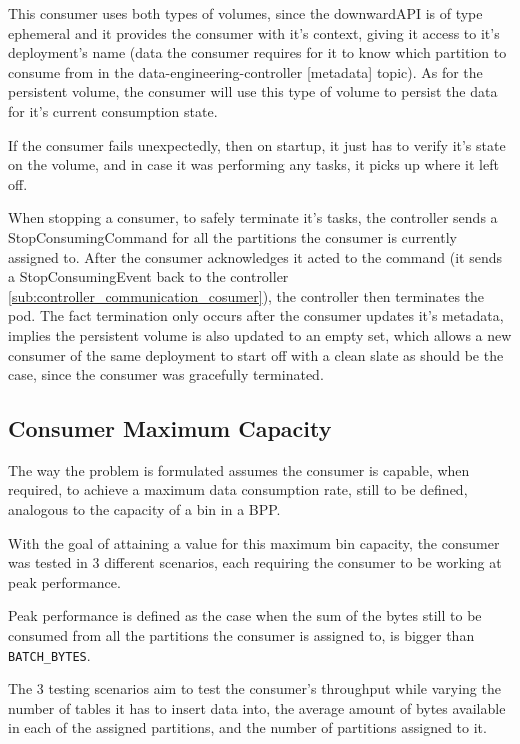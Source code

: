 This consumer uses both types of volumes, since the downwardAPI is of type
ephemeral and it provides the consumer with it's context, giving it access to
it's deployment's name (data the consumer requires for it to know which
partition to consume from in the data-engineering-controller [metadata] topic).
As for the persistent volume, the consumer will use this type of volume to
persist the data for it's current consumption state.

If the consumer fails unexpectedly, then on startup, it just has to verify it's
state on the volume, and in case it was performing any tasks, it picks up where
it left off.

When stopping a consumer, to safely terminate it's tasks, the controller sends a
StopConsumingCommand for all the partitions the consumer is currently assigned
to. After the consumer acknowledges it acted to the command (it sends a
StopConsumingEvent back to the controller
\ref{sub:controller_communication_cosumer}), the controller then terminates the
pod. The fact termination only occurs after the consumer updates it's metadata,
implies the persistent volume is also updated to an empty set, which allows a
new consumer of the same deployment to start off with a clean slate as should be
the case, since the consumer was gracefully terminated.


\subsection{Consumer Maximum Capacity}
\label{c3subsub:consumer_maximum_capacity}

The way the problem is formulated assumes the consumer is capable, when
required, to achieve a maximum data consumption rate, still to be defined,
analogous to the capacity of a bin in a BPP.

With the goal of attaining a value for this maximum bin capacity, the consumer
was tested in 3 different scenarios, each requiring the consumer to be working
at peak performance.

Peak performance is defined as the case when the sum of the bytes still to be
consumed from all the partitions the consumer is assigned to, is bigger than
\lstinline[language=Python]{BATCH_BYTES}.

The 3 testing scenarios aim to test the consumer's throughput while varying the
number of tables it has to insert data into, the average amount of bytes
available in each of the assigned partitions, and the number of partitions
assigned to it.

